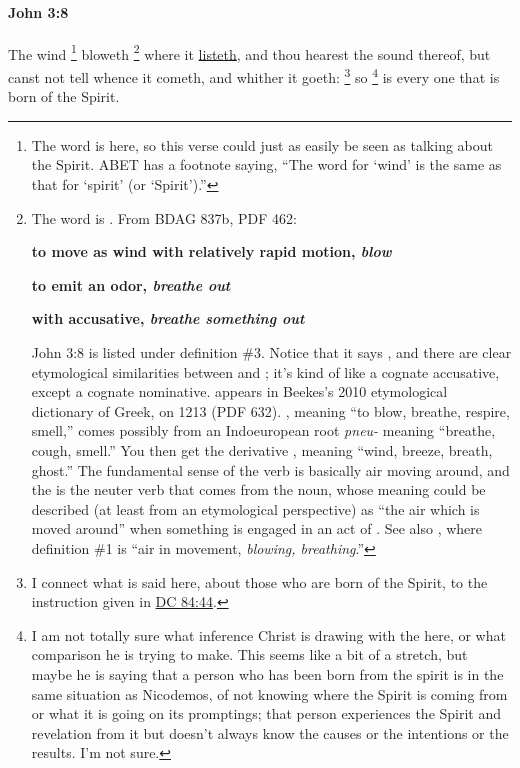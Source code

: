 		\paragraph{John 3:8} %
			\label{JOHN-3-8}

			The wind%
				\footnote{%
					The word is  here, so this verse could just as easily be seen as talking about the Spirit. ABET has a footnote saying, ``The word for `wind' is the same as that for `spirit' (or `Spirit').''
					}
			bloweth%
				\footnote{%
					The word is . From BDAG 837b, PDF 462:
						\begin{compactitem}
							\item[1] \textbf{to move as wind with relatively rapid motion, \textit{blow}}
							\item[2] \textbf{to emit an odor, \textit{breathe out}}
							\item[3] \textbf{with accusative, \textit{breathe something out}}
						\end{compactitem}
					John 3:8 is listed under definition \#3. Notice that it says , and there are clear etymological similarities between  and ; it's kind of like a cognate accusative, except a cognate nominative.  appears in Beekes's 2010 etymological dictionary of Greek, on 1213 (PDF 632). , meaning ``to blow, breathe, respire, smell,'' comes possibly from an Indoeuropean root \textit{pneu-} meaning ``breathe, cough, smell.'' You then get the derivative , meaning ``wind, breeze, breath, ghost.'' The fundamental sense of the verb is basically air moving around, and the  is the neuter verb that comes from the noun, whose meaning could be described (at least from an etymological perspective) as ``the air which is moved around'' when something is engaged in an act of . See also \hyperref[PNEUMA]{}, where definition \#1 is ``air in movement, \textit{blowing, breathing}.''
					}
			where it \hyperref[LIST]{listeth}, and thou hearest the sound thereof, but canst not tell whence it cometh, and whither it goeth:
				\footnote{%
					I connect what is said here, about those who are born of the Spirit, to the instruction given in \hyperref[DC84-44]{DC 84:44}.
					}%
			so%
				\footnote{%
					I am not totally sure what inference Christ is drawing with the  here, or what comparison he is trying to make. This seems like a bit of a stretch, but maybe he is saying that a person who has been born from the spirit is in the same situation as Nicodemos, of not knowing where the Spirit is coming from or what it is going on its promptings; that person experiences the Spirit and revelation from it but doesn't always know the causes or the intentions or the results. I'm not sure. 
					}
			is every one that is born of the Spirit.

